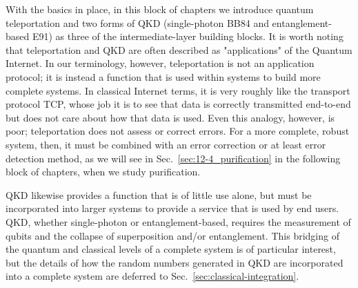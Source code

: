
\begin{partintro}
With the basics in place, in this block of chapters we introduce quantum teleportation and two forms of QKD (single-photon BB84 and entanglement-based E91) as three of the intermediate-layer building blocks.  It is worth noting that teleportation and QKD are often described as "applications" of the Quantum Internet. In our terminology, however, teleportation is not an application protocol; it is instead a function that is used within systems to build more complete systems. In classical Internet terms, it is very roughly like the transport protocol TCP, whose job it is to see that data is correctly transmitted end-to-end but does not care about how that data is used. Even this analogy, however, is poor; teleportation does not assess or correct errors. For a more complete, robust system, then, it must be combined with an error correction or at least error detection method, as we will see in Sec.~\ref{sec:12-4_purification} in the following block of chapters, when we study purification.

QKD likewise provides a function that is of little use alone, but must be incorporated into larger systems to provide a service that is used by end users. QKD, whether single-photon or entanglement-based, requires the measurement of qubits and the collapse of superposition and/or entanglement. This bridging of the quantum and classical levels of a complete system is of particular interest, but the details of how the random numbers generated in QKD are incorporated into a complete system are deferred to Sec.~\ref{sec:classical-integration}.
\end{partintro}
